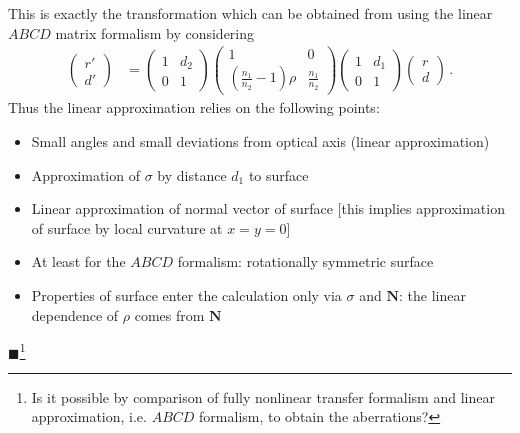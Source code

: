 \documentclass[12pt,a4paper,twoside,openright,BCOR10mm,headsepline,titlepage,abstracton,chapterprefix,final]{scrreprt}
\newcommand\Vector[1]{{\mathbf{#1}}}
\newcommand{\remark}[1]{{\color{red}$\blacksquare$}\footnote{{\color{red}#1}}}
\begin{document}
This is exactly the transformation which can be obtained from using the linear $ABCD$ matrix formalism by considering
\begin{align}
 \begin{pmatrix} r'  \\ d' \end{pmatrix} &=
 \begin{pmatrix} 1 & d_2 \\ 0 & 1 \end{pmatrix}
 \begin{pmatrix} 1 & 0 \\ \left(\frac{n_1}{n_2} - 1\right)\rho & \frac{n_1}{n_2} \end{pmatrix}
 \begin{pmatrix} 1 & d_1 \\ 0 & 1 \end{pmatrix}
 \begin{pmatrix} r  \\ d \end{pmatrix}\,.
\end{align}
Thus the linear approximation relies on the following points:
\begin{itemize}
 \item Small angles and small deviations from optical axis (linear approximation)
 \item Approximation of $\sigma$ by distance $d_1$ to surface 
 \item Linear approximation of normal vector of surface [this implies approximation of surface by local curvature at $x=y=0$]
 \item At least for the $ABCD$ formalism: rotationally symmetric surface
 \item Properties of surface enter the calculation only via $\sigma$ and $\Vector{N}$: the linear dependence of $\rho$ comes from $\Vector{N}$
\end{itemize}
\remark{Is it possible by comparison of fully nonlinear transfer formalism and linear approximation, i.e. $ABCD$ formalism, to obtain the
aberrations?}
\end{document}
